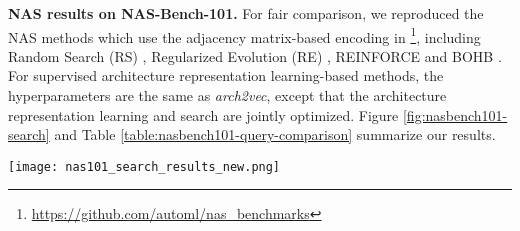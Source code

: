 \textbf{NAS results on NAS-Bench-101.}
For fair comparison, we reproduced the NAS methods which use the adjacency matrix-based encoding in \cite{pmlr-v97-ying19a}\footnote{\url{https://github.com/automl/nas_benchmarks}}, including Random Search (RS) \cite{bergstra12randsearch}, Regularized Evolution (RE) \cite{real2019regularized},  REINFORCE \cite{williams92rl} and BOHB \cite{falkner-icml-18}. 
For supervised architecture representation learning-based  methods, the hyperparameters are the same as \textit{arch2vec}, except that the architecture representation learning and search are jointly optimized. Figure \ref{fig:nasbench101-search} and Table \ref{table:nasbench101-query-comparison} summarize our results. 


\begin{figure*}[ht]
\centering
\texttt{[image: nas101\_search\_results\_new.png]}
\caption{Comparison of NAS performance between discrete encoding, supervised architecture representation learning, and \textit{arch2vec} on NAS-Bench-101. The plot shows the mean test regret (left) and the empirical cumulative distribution of the final test regret (right) of 500 independent runs given  a wall-clock time budget of  seconds.}
\vspace{1mm}
\label{fig:nasbench101-search}
\end{figure*}

